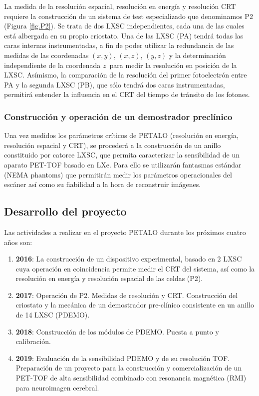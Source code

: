 La medida de la resolución espacial, resolución en energía y resolución CRT requiere la construcción de un sistema de test especializado que denominamos P2 (Figura \ref{fig.P2}). Se trata de dos LXSC independientes, cada una de las cuales está albergada en su propio criostato. Una de las LXSC (PA) tendrá todas las caras internas instrumentadas, a fin de poder utilizar la redundancia de las medidas de las coordenadas $(x,y)$, $(x,z)$, $(y,z)$ y la determinación independiente de la coordenada $z$~para medir la resolución en posición de la LXSC. Asímismo, la comparación de la resolución del primer fotoelectrón entre PA y la segunda LXSC (PB), que sólo tendrá dos caras instrumentadas, permitirá entender la influencia en el CRT del tiempo de tránsito de los fotones.  

\subsubsection*{Construcción y operación de un demostrador preclínico}
Una vez medidos los parámetros críticos de PETALO (resolución en energía, resolución espacial y CRT), se procederá a la construcción de un anillo constituido por catorce LXSC, que permita caracterizar la sensibilidad de un aparato PET-TOF basado en LXe. Para ello se utilizarán fantasmas estándar (NEMA phantoms) que permitirán medir los parámetros operacionales del escáner así como su fiabilidad a la hora de reconstruir imágenes.

\subsection*{Desarrollo del proyecto}
Las actividades a realizar en el proyecto PETALO durante los próximos cuatro años son:
\begin{enumerate}
\item {\bf 2016}: La construcción de un dispositivo experimental, basado en 2 LXSC cuya operación en coincidencia permite medir el CRT del sistema, así como la resolución en energía y resolución espacial de las celdas (P2).
\item {\bf 2017}: Operación de P2. Medidas de resolución y CRT. Construcción del criostato y la mecánica de un demostrador pre-clínico consistente en un anillo de 14 LXSC (PDEMO). 
\item {\bf 2018}: Construcción de los módulos de PDEMO. Puesta a punto y calibración. 
\item {\bf 2019}: Evaluación de la sensibilidad PDEMO y de su resolución TOF. Preparación de un proyecto para la construcción y comercialización de un PET-TOF de alta sensibilidad combinado con resonancia magnética (RMI) para neuroimagen cerebral.   
\end{enumerate}

